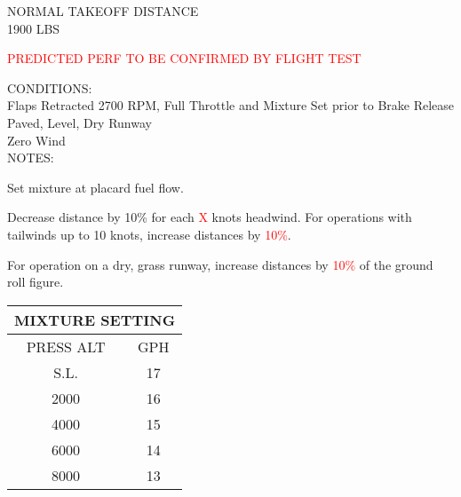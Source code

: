 \begin{sidewaysfigure}[t]
\begin{center}
\begin{perfhdr}NORMAL TAKEOFF DISTANCE\\
1900 LBS
\end{perfhdr}
\Large
\textcolor{red}{PREDICTED PERF TO BE CONFIRMED BY FLIGHT TEST}\normalsize \vspace{5ex}\\

\begin{minipage}{7.5in}
  \begin{flushleft}
    CONDITIONS:\\
    Flaps Retracted
    2700 RPM, Full Throttle and Mixture Set prior to Brake Release\\
    Paved, Level, Dry Runway\\
    Zero Wind\\
\vspace{\perfnoteskip}
    NOTES:
    \begin{enumerate*}
      \item Set mixture at placard fuel flow.
      \item Decrease distance by 10\% for each \textcolor{red}{X} knots headwind.  For operations with tailwinds up to 10
      knots, increase distances by \textcolor{red}{10\%}.
      \item For operation on a dry, grass runway, increase distances by \textcolor{red}{10\%} of the ground roll figure.
      \end{enumerate*}
    \end{flushleft}
  \end{minipage}
\hfill
\begin{minipage}{1.5in}
  \begin{tabular}{|c|c|}
    \hline
    \multicolumn{2}{|c|}{MIXTURE SETTING}\\
    \hline
    PRESS ALT&GPH\\
    \hline
    S.L.&17\\
    2000&16\\
    4000&15\\
    6000&14\\
    8000&13\\
    \hline
    \end{tabular}
  \end{minipage}
\\


\end{center}
\end{sidewaysfigure}
